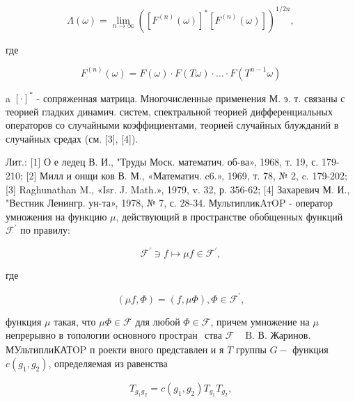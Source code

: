 \documentclass[10pt]{article}
\begin{document}
\[

\Lambda(\omega)=\lim _{n \rightarrow \infty}\left(\left[F^{(n)}(\omega)\right]^{*}\left[F^{(n)}(\omega)\right]\right)^{1 / 2 n},

\]



где



\[

F^{(n)}(\omega)=F(\omega) \cdot F(T \omega) \cdot \ldots \cdot F\left(T^{n-1} \omega\right)

\]



a $[\cdot]^{*}$ - сопряженная матрица. Многочисленные применения М. э. т. связаны с теорией гладких динамич. систем, спектральной теорией дифференциальных операторов со случайными коэффициентами, теорией случайных блужданий в случайных средах (см. [3], [4]).



Лит.: [1] О е ледец В. И., "Труды Моск. математич. об-ва», 1968, т. 19, с. 179-210; [2] Милл и онщи ков В. М., «Математич. c6.», 1969, т. 78, № 2, c. 179-202; [3] Raghunathan M., «Isr. J. Math.», 1979, v. 32, р. 356-62; [4] Захаревич М. И., "Вестник Ленингр. ун-та», 1978, № 7, с. 28-34. МультипликAтOP - оператор умножения на функцию $\mu$, действующий в пространстве обобщенных функций $\mathscr{F}^{\prime}$ по правилу:



\[

\mathscr{F}^{\prime} \ni f \mapsto \mu f \in \mathscr{F}^{\prime},

\]



где



\[

(\mu f, \Phi)=(f, \mu \Phi), \Phi \in \mathscr{F}^{\prime},

\]



функция $\mu$ такая, что $\mu \Phi \in \mathscr{F}$ для любой $\Phi \in \mathscr{F}$, причем умножение на $\mu$ непрерывно в топологии основного простран$\begin{array}{lll}\text { ства } \mathscr{F} & \text { B. В. Жаринов. }\end{array}$ МУльтиплиКАТOP п роекти вного представлен и я $T$ группы $G-$ функция $c\left(g_{1}, g_{2}\right)$, определяемая из равенства



\[

T_{g_{1} g_{2}}=c\left(g_{1}, g_{2}\right) T_{g_{1}} T_{g_{2}},

\]
\end{document}
